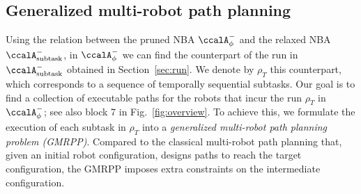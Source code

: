 \documentclass[Afour,sageh,times]{sagej}
\newcommand{\auto}[1]{\ccalA_{\text{#1}}}
\newcommand{\autop}{\ccalA_{\phi}}
\begin{document}
 {\subsection{Generalized multi-robot path planning}\label{sec:mapp}
   Using  the relation between the pruned NBA  $\autop^-$ and the relaxed NBA $\auto{subtask}^-$, in $\autop^-$ we can find the counterpart  of the  run in $\auto{subtask}^-$ obtained in Section~\ref{sec:run}. We denote by $\rho_T$ this counterpart, which corresponds to  a sequence of temporally sequential subtasks. Our goal is to find a collection of executable paths for the robots that incur the run $\rho_T$ in $\autop^-$; see also block 7 in Fig.~\ref{fig:overview}. To achieve this, we formulate  the execution of each subtask in $\rho_T$ into a {\it generalized multi-robot path planning problem (GMRPP)}. Compared to the classical multi-robot path planning that, given an initial robot configuration, designs paths to reach the target configuration, the GMRPP imposes extra constraints on the intermediate configuration.


}
\end{document}

